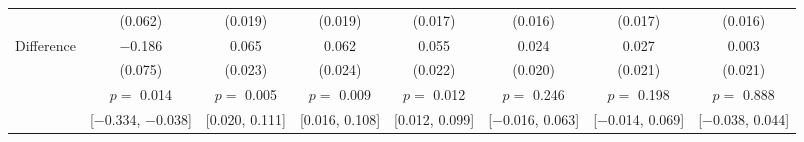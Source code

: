 \begin{tabular}[t]{lccccccc}
 & (\num{0.062}) & (\num{0.019}) & (\num{0.019}) & (\num{0.017}) & (\num{0.016}) & (\num{0.017}) & (\num{0.016})\\\cmidrule(lr){2-8}
\hspace{1em} Difference & \num{-0.186} & \num{0.065} & \num{0.062} & \num{0.055} & \num{0.024} & \num{0.027} & \num{0.003}\\
 & (\num{0.075}) & (\num{0.023}) & (\num{0.024}) & (\num{0.022}) & (\num{0.020}) & (\num{0.021}) & (\num{0.021})\\
 & $p =$ \num{0.014} & $p =$ \num{0.005} & $p =$ \num{0.009} & $p =$ \num{0.012} & $p =$ \num{0.246} & $p =$ \num{0.198} & $p =$ \num{0.888}\\
 & {}[\num{-0.334}, \num{-0.038}] & {}[\num{0.020}, \num{0.111}] & {}[\num{0.016}, \num{0.108}] & {}[\num{0.012}, \num{0.099}] & {}[\num{-0.016}, \num{0.063}] & {}[\num{-0.014}, \num{0.069}] & {}[\num{-0.038}, \num{0.044}]\\
\end{tabular}
